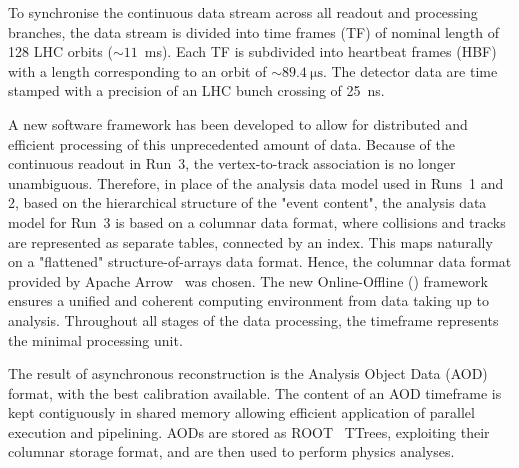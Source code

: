 To synchronise the continuous data stream across all readout and processing branches, the data stream is divided into time frames (TF) of nominal length of 128 LHC orbits ($\sim11$~ms). Each TF is subdivided into heartbeat frames (HBF) with a length corresponding to an orbit of $\sim\SI{89.4}{\micro\second}$. The detector data are time stamped with a precision of an LHC bunch crossing of 25~ns. 

A new software framework has been developed to allow for distributed and efficient processing of this unprecedented amount of data. Because of the continuous readout in Run~3, the vertex-to-track association is no longer unambiguous. Therefore, in place of the analysis data model used in Runs~1 and 2, based on the hierarchical structure of the "event content", the analysis data model for Run~3 is based on a columnar data format, where collisions and tracks are represented as separate tables, connected by an index. This maps naturally on a "flattened" structure-of-arrays data format. Hence, the columnar data format provided by Apache Arrow~\cite{ApacheArrow} was chosen. The new Online-Offline (\osq) framework ensures a unified and coherent computing environment from data taking up to analysis. Throughout all stages of the data processing, the timeframe represents the minimal processing unit. 

The result of asynchronous reconstruction is the Analysis Object Data (AOD) format, with the best calibration available. The content of an AOD timeframe is kept contiguously in shared memory allowing efficient application of parallel execution and pipelining. AODs are stored as ROOT~\cite{Brun:1997pa} TTrees, exploiting their columnar storage format, and are then used to perform physics analyses. 

